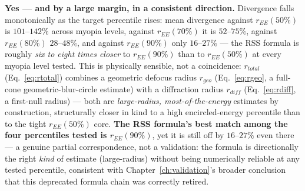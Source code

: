 

\textbf{Yes --- and by a large margin, in a consistent direction.} Divergence falls
monotonically as the target percentile rises: mean divergence against $r_{EE}(50\%)$ is
$101$--$142\%$ across myopia levels, against $r_{EE}(70\%)$ it is $52$--$75\%$, against
$r_{EE}(80\%)$ $28$--$48\%$, and against $r_{EE}(90\%)$ only $16$--$27\%$ --- the RSS
formula is roughly \emph{six to eight times closer} to $r_{EE}(90\%)$ than to
$r_{EE}(50\%)$ at every myopia level tested. This is physically sensible, not a
coincidence: $r_{total}$ (Eq.~\ref{eq:rtotal}) combines a geometric defocus radius
$r_{geo}$ (Eq.~\ref{eq:rgeo}, a full-cone geometric-blur-circle estimate) with a
diffraction radius $r_{diff}$ (Eq.~\ref{eq:rdiff}, a first-null radius) --- both are
\emph{large-radius, most-of-the-energy} estimates by construction, structurally closer
in kind to a high encircled-energy percentile than to the tight $r_{EE}(50\%)$ core.
\textbf{The RSS formula's best match among the four percentiles tested is
$r_{EE}(90\%)$}, yet it is still off by $16$--$27\%$ even there --- a genuine
partial correspondence, not a validation: the formula is directionally the right
\emph{kind} of estimate (large-radius) without being numerically reliable at any
tested percentile, consistent with Chapter~\ref{ch:validation}'s broader conclusion
that this deprecated formula chain was correctly retired.
